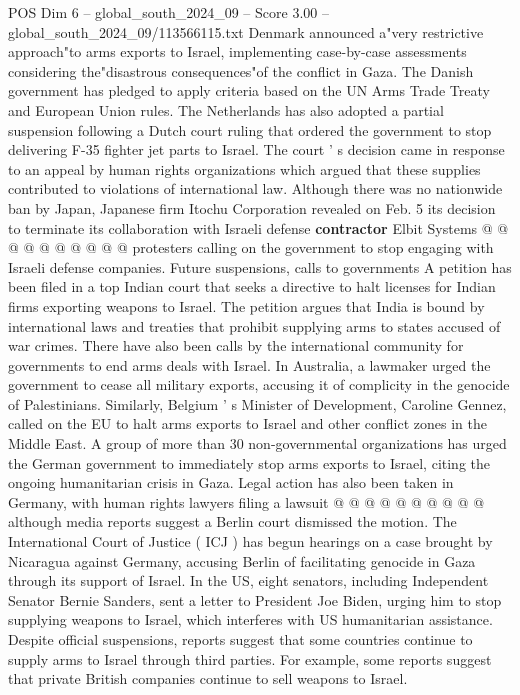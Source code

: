 \begin{textsample}{POS Dim 6 – global\_south\_2024\_09 – Score 3.00 – global\_south\_2024\_09/113566115.txt}
Denmark announced a"very restrictive approach"to arms exports to Israel, implementing case-by-case assessments considering the"disastrous consequences"of the conflict in Gaza.
The Danish government has pledged to apply criteria based on the UN Arms Trade Treaty and European Union rules.
The Netherlands has also adopted a partial suspension following a Dutch court ruling that ordered the government to stop delivering F-35 fighter jet parts to Israel.
The court ' s decision came in response to an appeal by human rights organizations which argued that these supplies contributed to violations of international law.
Although there was no nationwide ban by Japan, Japanese firm Itochu Corporation revealed on Feb. 5 its decision to terminate its collaboration with Israeli defense \textbf{contractor} Elbit Systems @ @ @ @ @ @ @ @ @ @ protesters calling on the government to stop engaging with Israeli defense companies.
Future suspensions, calls to governments A petition has been filed in a top Indian court that seeks a directive to halt licenses for Indian firms exporting weapons to Israel.
The petition argues that India is bound by international laws and treaties that prohibit supplying arms to states accused of war crimes.
There have also been calls by the international community for governments to end arms deals with Israel.
In Australia, a lawmaker urged the government to cease all military exports, accusing it of complicity in the genocide of Palestinians.
Similarly, Belgium ' s Minister of Development, Caroline Gennez, called on the EU to halt arms exports to Israel and other conflict zones in the Middle East.
A group of more than 30 non-governmental organizations has urged the German government to immediately stop arms exports to Israel, citing the ongoing humanitarian crisis in Gaza.
Legal action has also been taken in Germany, with human rights lawyers filing a lawsuit @ @ @ @ @ @ @ @ @ @ although media reports suggest a Berlin court dismissed the motion.
The International Court of Justice ( ICJ ) has begun hearings on a case brought by Nicaragua against Germany, accusing Berlin of facilitating genocide in Gaza through its support of Israel.
In the US, eight senators, including Independent Senator Bernie Sanders, sent a letter to President Joe Biden, urging him to stop supplying weapons to Israel, which interferes with US humanitarian assistance.
Despite official suspensions, reports suggest that some countries continue to supply arms to Israel through third parties.
For example, some reports suggest that private British companies continue to sell weapons to Israel.

\end{textsample}
